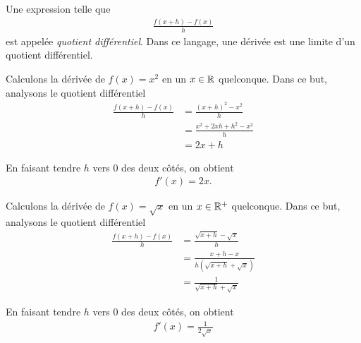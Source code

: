 \documentclass[main.tex]{subfiles}
\begin{document}
\begin{remark}
    Une expression telle que
    \begin{align}
        \frac {f(x + h) - f(x)} h
    \end{align}
    est appelée \emph{quotient différentiel}.
    Dans ce langage,
    une dérivée est une limite d'un quotient différentiel.
\end{remark}

\begin{example}
    [Dérivée de $x^2$]

    Calculons la dérivée de $f(x) = x^2$ en un $x \in \mathbb{R}$ quelconque.
    Dans ce but,
    analysons le quotient différentiel
    \begin{align}
        \frac {f(x + h) - f(x)} h
        &= \frac {{(x + h)}^2 - x^2} h\\
        &= \frac {x^2 + 2xh + h^2 - x^2} h\\
        &= 2x + h
    \end{align}

    En faisant tendre $h$ vers $0$ des deux côtés,
    on obtient
    \begin{align}
        f'(x) = 2x.
    \end{align}
\end{example}

\begin{example}

    Calculons la dérivée de $f(x) = \sqrt x$ en un $x \in \mathbb{R}^+$ quelconque.
    Dans ce but,
    analysons le quotient différentiel
    \begin{align}
        \frac {f(x + h) - f(x)} h
        &= \frac {\sqrt {x + h} - \sqrt x} h\\
        &= \frac {x + h - x} {h (\sqrt {x + h} + \sqrt {x})}\\
        &= \frac 1 {\sqrt {x + h} + \sqrt {x}}
    \end{align}

    En faisant tendre $h$ vers $0$ des deux côtés,
    on obtient
    \begin{align}
        f'(x) = \frac 1 {2 \sqrt x}
    \end{align}
\end{example}
\end{document}
